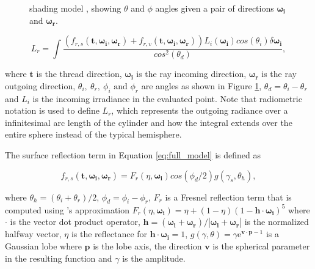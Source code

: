 \documentclass[12pt]{article}
\begin{document}
\begin{figure}[ht!]
\begin{minipage}[b]{.45\textwidth}
	\caption{\citeauthor{Sadeghi2013} shading model \cite{Sadeghi2013}, showing $\theta$ and $\phi$ angles given a pair of directions $\boldsymbol{\omega_i}$ and $\boldsymbol{\omega_r}$.}
	\label{fig:cloth_directions}
\end{minipage}
\end{figure}

\begin{equation}
L_r = \int \frac{\left(f_{r,s}(\mathbf{t}, \boldsymbol{\omega_i}, \boldsymbol{\omega_r}) + f_{r,v}(\mathbf{t},\boldsymbol{\omega_i},\boldsymbol{\omega_r})\right)L_i(\boldsymbol{\omega_i})cos(\theta_i)\delta \boldsymbol{\omega_i}}{cos^2(\theta_d)},
\label{eq:full_model}
\end{equation}

where $\mathbf{t}$ is the thread direction, $\boldsymbol{\omega_i}$ is the ray incoming direction, $\boldsymbol{\omega_r}$ is the ray outgoing direction, $\theta_i, ~\theta_r, ~ \phi_i \mbox{ and } \phi_r$ are angles as shown in Figure \ref{fig:cloth_directions},  $\theta_d = \theta_i-\theta_r$ and $L_i$ is the incoming irradiance in the evaluated point.
Note that radiometric notation \cite{Marschner2003} is used to define $L_r$, which represents the outgoing radiance over a infinitesimal arc length of the cylinder and how the integral extends over the entire sphere instead of the typical hemisphere.

The surface reflection term in Equation \ref{eq:full_model} is defined as

\begin{equation}
f_{r,s}(\mathbf{t}, \boldsymbol{\omega_i}, \boldsymbol{\omega_r}) = F_r(\eta, \boldsymbol{\omega_i}) cos(\phi_d/2)g(\gamma_s, \theta_h),
\end{equation}

where $\theta_h = (\theta_i+\theta_r)/2$, $\phi_d = \phi_i-\phi_r$, $F_r$ is a Fresnel reflection term that is computed using \citeauthor{Schlick1994}'s approximation \cite{Schlick1994} $F_r(\eta, \boldsymbol{\omega_i}) = \eta + (1 - \eta)(1 - \mathbf{h} \cdot \boldsymbol{\omega_i})^5$ where $\cdot$ is the vector dot product operator, $\mathbf{h} = (\boldsymbol{\omega_i} + \boldsymbol{\omega_r})/ \left|\boldsymbol{\omega_i} + \boldsymbol{\omega_r} \right|$ is the normalized halfway vector, $\eta$ is the reflectance for $\mathbf{h} \cdot \boldsymbol{\omega_i} = 1$, $g(\gamma, \theta) = \gamma \mathrm{e} ^{\mathbf{v} \cdot \mathbf{p}-1}$ is a Gaussian lobe \cite{Wang2009} where $\mathbf{p}$ is the lobe axis, the direction $\mathbf{v}$ is the spherical parameter in the resulting function and $\gamma$ is the amplitude.
\end{document}
